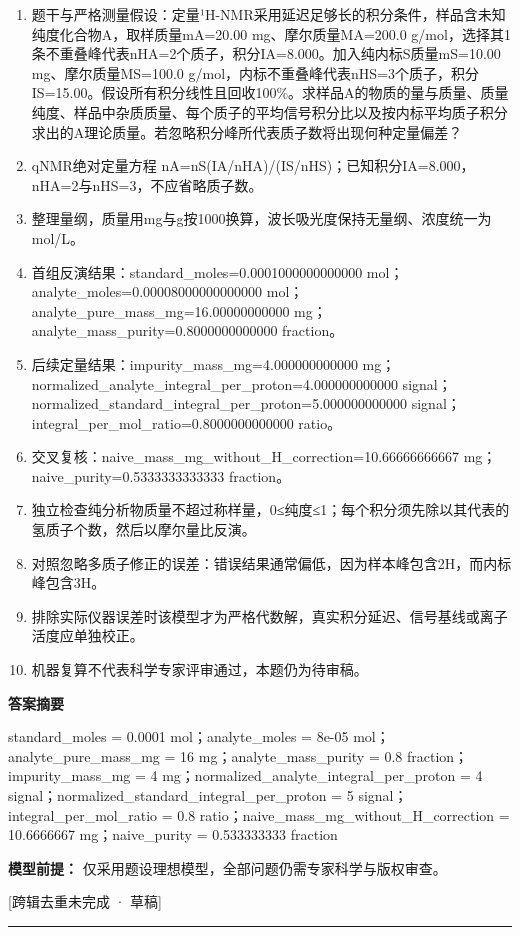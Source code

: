 \documentclass[UTF8,11pt,a4paper]{ctexart}
\begin{document}
\begin{enumerate}
\item 题干与严格测量假设：定量¹H-NMR采用延迟足够长的积分条件，样品含未知纯度化合物A，取样质量mA=20.00 mg、摩尔质量MA=200.0 g/mol，选择其1条不重叠峰代表nHA=2个质子，积分IA=8.000。加入纯内标S质量mS=10.00 mg、摩尔质量MS=100.0 g/mol，内标不重叠峰代表nHS=3个质子，积分IS=15.00。假设所有积分线性且回收100\%。求样品A的物质的量与质量、质量纯度、样品中杂质质量、每个质子的平均信号积分比以及按内标平均质子积分求出的A理论质量。若忽略积分峰所代表质子数将出现何种定量偏差？
\item qNMR绝对定量方程 nA=nS(IA/nHA)/(IS/nHS)；已知积分IA=8.000，nHA=2与nHS=3，不应省略质子数。
\item 整理量纲，质量用mg与g按1000换算，波长吸光度保持无量纲、浓度统一为mol/L。
\item 首组反演结果：standard\_moles=0.0001000000000000 mol；analyte\_moles=0.00008000000000000 mol；analyte\_pure\_mass\_mg=16.00000000000 mg；analyte\_mass\_purity=0.8000000000000 fraction。
\item 后续定量结果：impurity\_mass\_mg=4.000000000000 mg；normalized\_analyte\_integral\_per\_proton=4.000000000000 signal；normalized\_standard\_integral\_per\_proton=5.000000000000 signal；integral\_per\_mol\_ratio=0.8000000000000 ratio。
\item 交叉复核：naive\_mass\_mg\_without\_H\_correction=10.66666666667 mg；naive\_purity=0.5333333333333 fraction。
\item 独立检查纯分析物质量不超过称样量，0≤纯度≤1；每个积分须先除以其代表的氢质子个数，然后以摩尔量比反演。
\item 对照忽略多质子修正的误差：错误结果通常偏低，因为样本峰包含2H，而内标峰包含3H。
\item 排除实际仪器误差时该模型才为严格代数解，真实积分延迟、信号基线或离子活度应单独校正。
\item 机器复算不代表科学专家评审通过，本题仍为待审稿。
\end{enumerate}
\noindent\textbf{答案摘要}\par
standard\_moles = 0.0001 mol；analyte\_moles = 8e-05 mol；analyte\_pure\_mass\_mg = 16 mg；analyte\_mass\_purity = 0.8 fraction；impurity\_mass\_mg = 4 mg；normalized\_analyte\_integral\_per\_proton = 4 signal；normalized\_standard\_integral\_per\_proton = 5 signal；integral\_per\_mol\_ratio = 0.8 ratio；naive\_mass\_mg\_without\_H\_correction = 10.6666667 mg；naive\_purity = 0.533333333 fraction\par
\noindent\textbf{模型前提：}
仅采用题设理想模型，全部问题仍需专家科学与版权审查。\par
\noindent\textcolor{red!65!black}{[跨辑去重未完成 · 草稿]} \par
\medskip\hrule\medskip
{}
\end{document}
